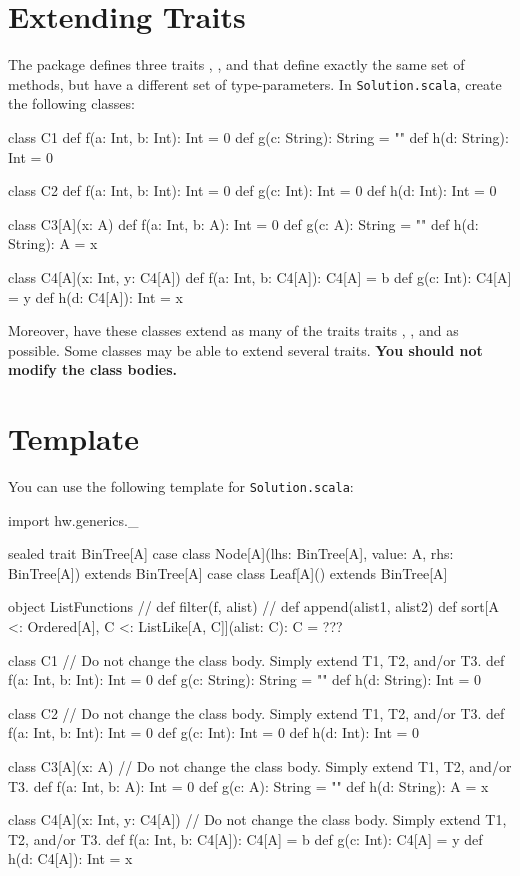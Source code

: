 \documentclass[9pt]{extbook}
\begin{document}
\section{Extending Traits}

The package  defines three traits ,
, and 
that define exactly the same
set of methods, but have a different set of type-parameters.
In \texttt{Solution.scala}, create the following classes:

\begin{scalacode}
class C1 {
  def f(a: Int, b: Int): Int = 0
  def g(c: String): String = ""
  def h(d: String): Int = 0
}


class C2 {
  def f(a: Int, b: Int): Int = 0
  def g(c: Int):  Int = 0
  def h(d: Int): Int = 0
}

class C3[A](x: A) {
  def f(a: Int, b: A): Int = 0
  def g(c: A): String = ""
  def h(d: String): A = x
}

class C4[A](x: Int, y: C4[A]) {
  def f(a: Int, b: C4[A]): C4[A] = b
  def g(c: Int): C4[A] = y
  def h(d: C4[A]): Int = x
}
\end{scalacode}

Moreover, have these classes extend as many of the traits
traits , , and 
as possible. Some classes may be able to extend several
traits. \textbf{You should not modify the class bodies.}



\section{Template}

You can use the following template for \texttt{Solution.scala}:
\begin{scalacode}
import hw.generics._

sealed trait BinTree[A]
case class Node[A](lhs: BinTree[A], value: A, rhs: BinTree[A]) extends BinTree[A]
case class Leaf[A]() extends BinTree[A]

object ListFunctions {
  // def filter(f, alist)
  // def append(alist1, alist2)
  def sort[A <: Ordered[A], C <: ListLike[A, C]](alist: C): C = ???
}

class C1 {
  // Do not change the class body. Simply extend T1, T2, and/or T3.
  def f(a: Int, b: Int): Int = 0
  def g(c: String): String = ""
  def h(d: String): Int = 0
}

class C2 {
  // Do not change the class body. Simply extend T1, T2, and/or T3.
  def f(a: Int, b: Int): Int = 0
  def g(c: Int):  Int = 0
  def h(d: Int): Int = 0
}


class C3[A](x: A) {
  // Do not change the class body. Simply extend T1, T2, and/or T3.
  def f(a: Int, b: A): Int = 0
  def g(c: A): String = ""
  def h(d: String): A = x
}

class C4[A](x: Int, y: C4[A]) {
  // Do not change the class body. Simply extend T1, T2, and/or T3.
  def f(a: Int, b: C4[A]): C4[A] = b
  def g(c: Int): C4[A] = y
  def h(d: C4[A]): Int = x
}
\end{scalacode}
\end{document}
